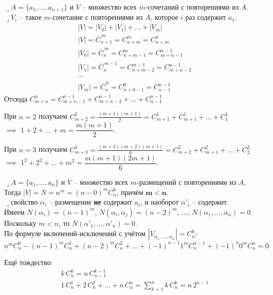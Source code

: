 \documentclass[a4paper,12pt,fleqn]{article}
\newenvironment{onsamepage} {\begin{minipage}{\textwidth}} {\end{minipage}}
\numberwithin{figure}{section}
\theoremstyle{definition}
\def\lets{{\huge$\lrcorner$}\space}
\begin{document}
\begin{onsamepage}
\lets $A=\{a_1,...,a_{n+1}\}$ и $V$ -- множество всех $m$-сочетаний с повторениями из $A$. \\
\lets $V_i$ -- такое $m$-сочетание с повторениями из $A$, которое $i$ раз содержит $a_1$.
\begin{align*}
&	|V|=|V_0|+|V_1|+...+|V_m|	\\
&	|V| = \overline{C}_{n+1}^{\,m} = C_{n+m}^m = C_{n+m}^n				\\
&	|V_0| = \overline{C}_n^{\,m} = C_{n+m-1}^{m} = C_{m+n-1}^{n-1}		\\
&	|V_1| = \overline{C}_n^{\,m-1} = C_{n+m-2}^{m-1} = C_{m+n-2}^{n-1}	\\
&	\cdots	\\
&	|V_m| = \overline{C}_n^{\,0} = C_{n+0-1}^0 = C_{n-1}^{n-1}
\end{align*}
Отсюда $C_{m+n}^n = C_{m+n-1}^{n-1} + C_{m+n-2}^{n-1} + ... + C_{n-1}^{n-1}$

\bigskip
При $n=2$
получаем $C_{m+2}^2 = \tfrac{(m+1)(m+1)}{2} = C_{m+1}^1+C_{m+1}^1+...+C_1^1$ \\
$\implies$ $1+2+...+m = \dfrac{m(m+1)}{2}$.

\medskip
При $n=3$
получаем $C_{m+3}^3 = \tfrac{(m+3)(m+2)(m+1)}{6} = C_{m+2}^2+C_{m+1}^2+...+C_2^2$ \\
$\implies$ $1^2+2^2+...+m^2 = \dfrac{m(m+1)(2m+1)}{6}$.
\end{onsamepage}

\begin{onsamepage}
\lets $A=\{a_1,...,a_n\}$ и $V$ -- множество всех $m$-размещений с повторениями из $A$, \\
Тогда $|V| = N = n^m = (n-0)^m C_n^0$, причём $\pmb{m<n}$. \\
\lets свойство $\alpha_i$ -- размещение \textbf{не} содержит $a_i$,
      и наоборот $\alpha'_i$ -- содержит. \\
Имеем $N(\alpha_i)=(n-1)^m$,
      $N(\alpha_i,\alpha_j)=(n-2)^m$, ...,
      $N(\alpha_1,...,\alpha_n)=0$. \\
Поскольку $m<n$, то $N(\alpha'_1,...,\alpha'_n)=0$. \\
По формуле включений-исключений с учётом
	$|V_{\alpha_{i_1},...,\alpha_{i_k}}| = C_n^k$:
\[ n^m C_n^0 - (n-1)^m C_n^1 + (n-2)^m C_n^2
   + ... + (-1)^{n-1} 1^m C_n^{n-1} + (-1)^n 0^m C_n^n = 0 \]
\end{onsamepage}

\medspace
Ещё тождество:
\begin{align*}
&	k \, C_n^k = n \, C_{n-1}^{k-1}		\\
&	1 \, C_n^1 + 2 \, C_n^2 + ... + n \, C_n^n = \sum_{k=1}^n k \, C_n^k = n \, 2^{n-1}
\end{align*}
\end{document}
